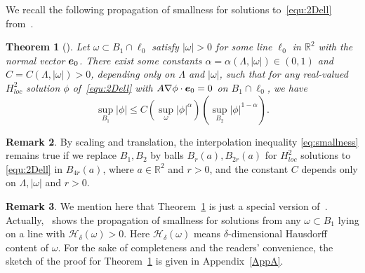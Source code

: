 \documentclass[a4paper,reqno]{amsart}
\newtheorem{theorem}{Theorem}[section]
\theoremstyle{definition}
\newtheorem{remark}[theorem]{Remark}
\numberwithin{equation}{section}
\newcommand{\R}{\mathbb{R}}
\def \R {{\mathbb{R} }}
\begin{document}
We recall the following propagation of smallness for solutions to~\eqref{equ:2Dell} from~\cite{ZHU}.
\begin{theorem}[\cite{ZHU}]\label{thm:ZHU}
Let $\omega\subset B_{1}\cap \ell_{0}$ satisfy $|\omega|>0$ for some line $\ell_{0}$ in $\R^{2}$ with the normal vector $\boldsymbol{\rm{e}}_{0}$. There exist some constants $\alpha=\alpha(\Lambda, |\omega|)\in(0,1)$ and $C=C(\Lambda,|\omega|)>0$, depending only on $\Lambda$ and $|\omega|$, such that for any real-valued $H_{loc}^{2}$ solution $\phi$ of~\eqref{equ:2Dell} with $A\nabla \phi\cdot \boldsymbol{\rm{e}}_{0}=0$ on $B_{1}\cap \ell_{0}$, we have 
\begin{equation}\label{eq:smallness}
\sup_{B_{1}}|\phi|\le C\left(\sup_{\omega}|\phi|^{\alpha}\right)\left(\sup_{B_{2}}|\phi|^{1-\alpha}\right).
\end{equation}
\end{theorem}
\begin{remark}\label{rk:technical}
By scaling and translation, the interpolation inequality \eqref{eq:smallness} remains true if we replace $B_1,B_2$ by balls $B_r(a),B_{2r}(a)$ for $H_{loc}^2$ solutions to \eqref{equ:2Dell} in $B_{4r}(a)$, where $a \in \R^2$ and $r>0$, and the constant $C$ depends only on $\Lambda,|\omega|$ and $r>0$.
\end{remark}
\begin{remark}
We mention here that Theorem~\ref{thm:ZHU} is just a special version of~\cite[Theorem 1.1]{ZHU}. Actually,~\cite[Theorem 1.1]{ZHU} shows the propagation of smallness for solutions from any $\omega\subset B_{1}$ lying on a line with $\mathcal{H}_{\delta}(\omega)>0$. Here $\mathcal{H}_{\delta}(\omega)$ means $\delta$-dimensional Hausdorff content of $\omega$. For the sake of completeness and the readers' convenience, the sketch of the proof for Theorem~\ref{thm:ZHU} is given in Appendix~\ref{AppA}.
\end{remark} 
\end{document}
